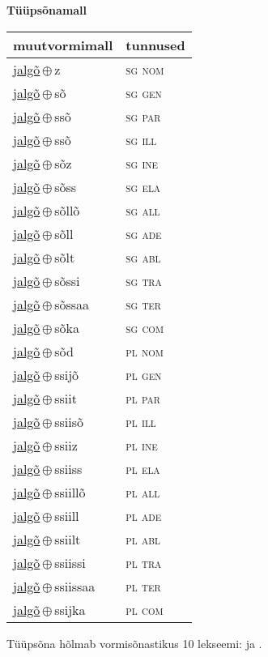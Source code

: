 

\vspace{3.5em}
\noindent \begin{minipage}{\textwidth}
\noindent \textbf{Tüüpsõnamall \,}\\

\begin{sideways}
\begin{tabular}{l l}
muutvormimall & tunnused \\
\hline
\underline{jalgõ}\,$\oplus$\,z & \textsc{ sg nom } \\
\underline{jalgõ}\,$\oplus$\,sõ & \textsc{ sg gen } \\
\underline{jalgõ}\,$\oplus$\,ssõ & \textsc{ sg par } \\
\underline{jalgõ}\,$\oplus$\,ssõ & \textsc{ sg ill } \\
\underline{jalgõ}\,$\oplus$\,sõz & \textsc{ sg ine } \\
\underline{jalgõ}\,$\oplus$\,sõss & \textsc{ sg ela } \\
\underline{jalgõ}\,$\oplus$\,sõllõ & \textsc{ sg all } \\
\underline{jalgõ}\,$\oplus$\,sõll & \textsc{ sg ade } \\
\underline{jalgõ}\,$\oplus$\,sõlt & \textsc{ sg abl } \\
\underline{jalgõ}\,$\oplus$\,sõssi & \textsc{ sg tra } \\
\underline{jalgõ}\,$\oplus$\,sõssaa & \textsc{ sg ter } \\
\underline{jalgõ}\,$\oplus$\,sõka & \textsc{ sg com } \\
\underline{jalgõ}\,$\oplus$\,sõd & \textsc{ pl nom } \\
\underline{jalgõ}\,$\oplus$\,ssijõ & \textsc{ pl gen } \\
\underline{jalgõ}\,$\oplus$\,ssiit & \textsc{ pl par } \\
\underline{jalgõ}\,$\oplus$\,ssiisõ & \textsc{ pl ill } \\
\underline{jalgõ}\,$\oplus$\,ssiiz & \textsc{ pl ine } \\
\underline{jalgõ}\,$\oplus$\,ssiiss & \textsc{ pl ela } \\
\underline{jalgõ}\,$\oplus$\,ssiillõ & \textsc{ pl all } \\
\underline{jalgõ}\,$\oplus$\,ssiill & \textsc{ pl ade } \\
\underline{jalgõ}\,$\oplus$\,ssiilt & \textsc{ pl abl } \\
\underline{jalgõ}\,$\oplus$\,ssiissi & \textsc{ pl tra } \\
\underline{jalgõ}\,$\oplus$\,ssiissaa & \textsc{ pl ter } \\
\underline{jalgõ}\,$\oplus$\,ssijka & \textsc{ pl com } \\
\end{tabular}
\end{sideways}
\label{tab:tüüpsõnamall-jalgõz}

\end{minipage}

 
\vspace{1em}
\noindent Tüüpsõna hõlmab vormisõnastikus 10 lekseemi:  ja .
